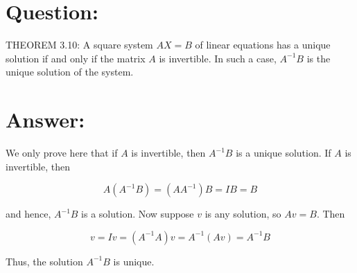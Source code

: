 \documentclass{article}
\begin{document}
\section{Question:}

THEOREM 3.10: A square system $A X=B$ of linear equations has a unique solution if and only if the matrix $A$ is invertible. In such a case, $A^{-1} B$ is the unique solution of the system.

\section{Answer:}

We only prove here that if $A$ is invertible, then $A^{-1} B$ is a unique solution. If $A$ is invertible, then

$$
    A\left(A^{-1} B\right)=\left(A A^{-1}\right) B=I B=B
$$

and hence, $A^{-1} B$ is a solution. Now suppose $v$ is any solution, so $A v=B$. Then

$$
    v=I v=\left(A^{-1} A\right) v=A^{-1}(A v)=A^{-1} B
$$

Thus, the solution $A^{-1} B$ is unique.
\end{document}
